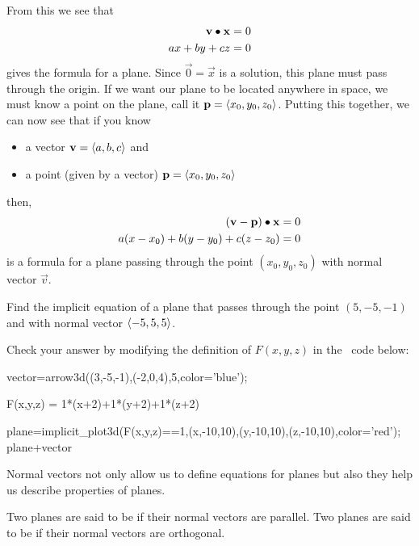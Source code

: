 \documentclass{ximera}
\begin{document}
From this we see that
\begin{align*}
\mathbf{v}\bullet\mathbf{x} &=0\\
ax+by+cz &= 0
\end{align*}
gives the formula for a plane. Since $\vec{0} = \vec{x}$ is a
solution, this plane must pass through the origin. If we want our
plane to be located anywhere in space, we must know a point on the
plane, call it $\mathbf{p}=\left\langle x_0,y_0,z_0\right\rangle$. Putting this together, we can
now see that if you know
\begin{itemize}
  \item a vector $\mathbf{v} = \left\langle a,b,c\right\rangle$ and
  \item a point (given by a vector) $\mathbf{p} = \left\langle x_0,y_0,z_0\right\rangle$
\end{itemize}
then,
\begin{align*}
  (\mathbf{v}-\mathbf{p})\bullet \mathbf{x} &= 0\\
  a(x-x_0) + b(y-y_0) + c(z-z_0) &= 0
\end{align*}
is a formula for a plane passing through the point $(x_0,y_0,z_0)$
with normal vector $\vec{v}$.

\begin{question}
  Find the implicit equation of a plane that passes through the point
  $(5,-5,-1)$ and with normal vector $\left\langle -5,5,5\right\rangle$.
  \begin{onlineOnly}
    Check your answer by modifying the definition of $F(x,y,z)$ in
    the \sage\ code below:
  \begin{sageCell}
vector=arrow3d((3,-5,-1),(-2,0,4),5,color='blue');

F(x,y,z) = 1*(x+2)+1*(y+2)+1*(z+2)

plane=implicit_plot3d(F(x,y,z)==1,(x,-10,10),(y,-10,10),(z,-10,10),color='red');
plane+vector
  \end{sageCell}
  \end{onlineOnly}
\end{question}

Normal vectors not only allow us to define equations for planes but also 
they help us describe properties of planes.

\begin{definition}
  Two planes are said to be  if their normal vectors are
  parallel. Two planes are said to be  if their normal
  vectors are orthogonal.
\end{definition}
\end{document}
